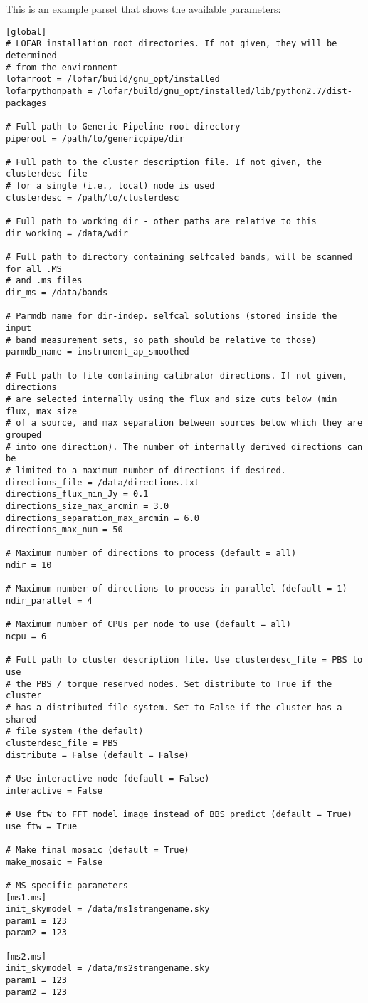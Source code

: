 \documentclass[structabstract]{article}
\begin{document}
This is an example parset that shows the available parameters:
\begin{verbatim}
[global]
# LOFAR installation root directories. If not given, they will be determined
# from the environment
lofarroot = /lofar/build/gnu_opt/installed
lofarpythonpath = /lofar/build/gnu_opt/installed/lib/python2.7/dist-packages

# Full path to Generic Pipeline root directory
piperoot = /path/to/genericpipe/dir

# Full path to the cluster description file. If not given, the clusterdesc file
# for a single (i.e., local) node is used
clusterdesc = /path/to/clusterdesc

# Full path to working dir - other paths are relative to this
dir_working = /data/wdir

# Full path to directory containing selfcaled bands, will be scanned for all .MS
# and .ms files
dir_ms = /data/bands

# Parmdb name for dir-indep. selfcal solutions (stored inside the input
# band measurement sets, so path should be relative to those)
parmdb_name = instrument_ap_smoothed

# Full path to file containing calibrator directions. If not given, directions
# are selected internally using the flux and size cuts below (min flux, max size
# of a source, and max separation between sources below which they are grouped
# into one direction). The number of internally derived directions can be
# limited to a maximum number of directions if desired.
directions_file = /data/directions.txt
directions_flux_min_Jy = 0.1
directions_size_max_arcmin = 3.0
directions_separation_max_arcmin = 6.0
directions_max_num = 50

# Maximum number of directions to process (default = all)
ndir = 10

# Maximum number of directions to process in parallel (default = 1)
ndir_parallel = 4

# Maximum number of CPUs per node to use (default = all)
ncpu = 6

# Full path to cluster description file. Use clusterdesc_file = PBS to use
# the PBS / torque reserved nodes. Set distribute to True if the cluster
# has a distributed file system. Set to False if the cluster has a shared
# file system (the default)
clusterdesc_file = PBS
distribute = False (default = False)

# Use interactive mode (default = False)
interactive = False

# Use ftw to FFT model image instead of BBS predict (default = True)
use_ftw = True

# Make final mosaic (default = True)
make_mosaic = False

# MS-specific parameters
[ms1.ms]
init_skymodel = /data/ms1strangename.sky
param1 = 123
param2 = 123

[ms2.ms]
init_skymodel = /data/ms2strangename.sky
param1 = 123
param2 = 123
\end{verbatim}
\end{document}
